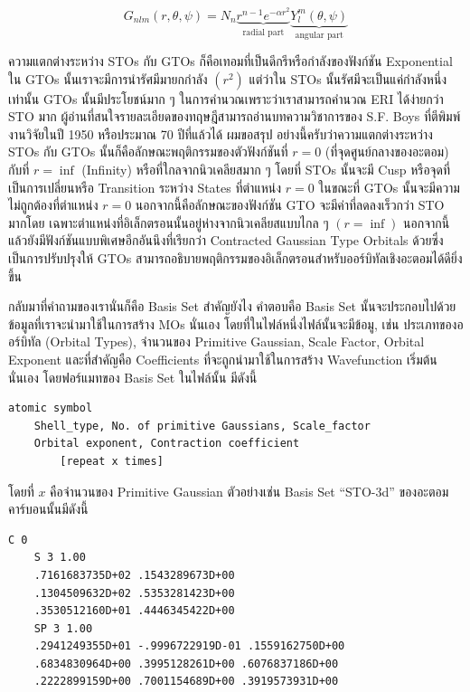 \begin{equation}
    \label{eq:gto}
    G_{nlm} (r, \theta , \psi )
    =
    N_n
    \underbrace
    {
        r^{n-1} e^{-\alpha r^2}
    }_
    {
        \text{radial part}
    }
    \underbrace
    {
        Y^m_l (\theta, \psi)
    }_
    {
    \text{angular part}
    }
\end{equation}

ความแตกต่างระหว่าง STOs กับ GTOs ก็คือเทอมที่เป็นดีกรีหรือกำลังของฟังก์ชัน Exponential ใน GTOs นั้นเราจะมีการนำรัศมีมายกกำลัง $(r^{2})$
แต่ว่าใน STOs นั้นรัศมีจะเป็นแค่กำลังหนึ่งเท่านั้น GTOs นั้นมีประโยชน์มาก ๆ ในการคำนวณเพราะว่าเราสามารถคำนวณ ERI ได้ง่ายกว่า STO มาก
ผู้อ่านที่สนใจรายละเอียดของทฤษฎีสามารถอ่านบทความวิชาการของ S.F. Boys ที่ตีพิมพ์งานวิจัยในปี 1950 หรือประมาณ 70 ปีที่แล้วได้ ผมขอสรุป%
อย่างนี้ครับว่าความแตกต่างระหว่าง STOs กับ GTOs นั้นก็คือลักษณะพฤติกรรมของตัวฟังก์ชันที่ $r = 0$ (ที่จุดศูนย์กลางของอะตอม) กับที่ $r = \inf$
(Infinity) หรือที่ใกลจากนิวเคลียสมาก ๆ โดยที่ STOs นั้นจะมี Cusp หรือจุดที่เป็นการเปลี่ยนหรือ Transition ระหว่าง States ที่ตำแหน่ง
$r = 0$ ในขณะที่ GTOs นั้นจะมีความไม่ถูกต้องที่ตำแหน่ง $r = 0$ นอกจากนี้คือลักษณะของฟังก์ชัน GTO จะมีค่าที่ลดลงเร็วกว่า STO มากโดย%
เฉพาะตำแหน่งที่อิเล็กตรอนนั้นอยู่ห่างจากนิวเคลียสแบบไกล ๆ $(r = \inf)$ นอกจากนี้แล้วยังมีฟังก์ชันแบบพิเศษอีกอันนึงที่เรียกว่า Contracted
Gaussian Type Orbitals ด้วยซึ่งเป็นการปรับปรุงให้ GTOs สามารถอธิบายพฤติกรรมของอิเล็กตรอนสำหรับออร์บิทัลเชิงอะตอมได้ดียิ่งขึ้น

กลับมาที่คำถามของเรานั่นก็คือ Basis Set สำคัญยังไง คำตอบคือ Basis Set นั้นจะประกอบไปด้วยข้อมูลที่เราจะนำมาใช้ในการสร้าง MOs นั่นเอง
โดยที่ในไฟล์หนึ่งไฟล์นั้นจะมีข้อมู, เช่น ประเภทของออร์บิทัล (Orbital Types), จำนวนของ Primitive Gaussian, Scale Factor, Orbital
Exponent และที่สำคัญคือ Coefficients ที่จะถูกนำมาใช้ในการสร้าง Wavefunction เริ่มต้นนั่นเอง โดยฟอร์แมทของ Basis Set ในไฟล์นั้น%
มีดังนี้

\begin{Verbatim}[frame=single]
    atomic symbol
    Shell_type, No. of primitive Gaussians, Scale_factor
    Orbital exponent, Contraction coefficient
        [repeat x times]
\end{Verbatim}

โดยที่ $x$ คือจำนวนของ Primitive Gaussian ตัวอย่างเช่น Basis Set \enquote{STO-3d} ของอะตอมคาร์บอนนั้นมีดังนี้

\begin{Verbatim}[frame=single]
    C 0
    S 3 1.00
    .7161683735D+02 .1543289673D+00
    .1304509632D+02 .5353281423D+00
    .3530512160D+01 .4446345422D+00
    SP 3 1.00
    .2941249355D+01 -.9996722919D-01 .1559162750D+00
    .6834830964D+00 .3995128261D+00 .6076837186D+00
    .2222899159D+00 .7001154689D+00 .3919573931D+00
\end{Verbatim}

